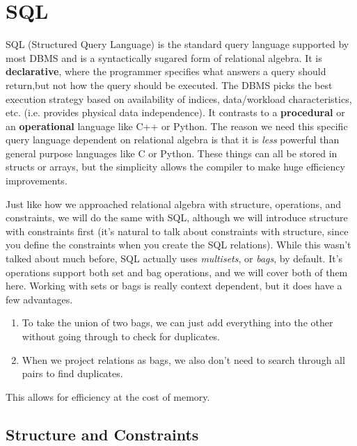 \section{SQL} 

  SQL (Structured Query Language) is the standard query language supported by most DBMS and is a syntactically sugared form of relational algebra. It is \textbf{declarative}, where the programmer specifies what answers a query should return,but not how the query should be executed. The DBMS picks the best execution strategy based on availability of indices, data/workload characteristics, etc. (i.e. provides physical data independence). It contrasts to a \textbf{procedural} or an \textbf{operational} language like C++ or Python. The reason we need this specific query language dependent on relational algebra is that it is \textit{less} powerful than general purpose languages like C or Python. These things can all be stored in structs or arrays, but the simplicity allows the compiler to make huge efficiency improvements. 

  Just like how we approached relational algebra with structure, operations, and constraints, we will do the same with SQL, although we will introduce structure with constraints first (it's natural to talk about constraints with structure, since you define the constraints when you create the SQL relations). While this wasn't talked about much before, SQL actually uses \textit{multisets}, or \textit{bags}, by default. It's operations support both set and bag operations, and we will cover both of them here. Working with sets or bags is really context dependent, but it does have a few advantages. 
  \begin{enumerate}
    \item To take the union of two bags, we can just add everything into the other without going through to check for duplicates. 
    \item When we project relations as bags, we also don't need to search through all pairs to find duplicates. 
  \end{enumerate}
  This allows for efficiency at the cost of memory. 

\subsection{Structure and Constraints}

